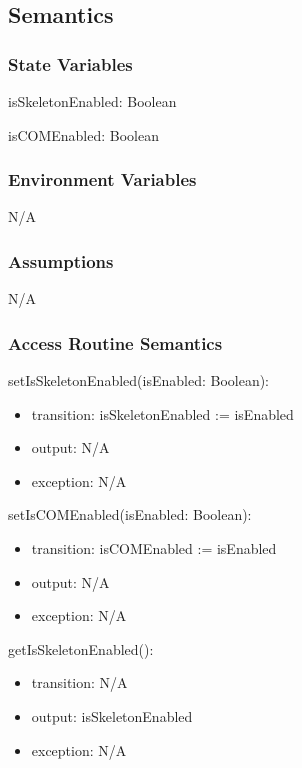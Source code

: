 \documentclass[12pt, titlepage]{article}
\begin{document}
\subsection{Semantics}

\subsubsection{State Variables}

\noindent isSkeletonEnabled: Boolean

\noindent isCOMEnabled: Boolean

\subsubsection{Environment Variables}

N/A

\subsubsection{Assumptions}

N/A

\subsubsection{Access Routine Semantics}

\noindent setIsSkeletonEnabled(isEnabled: Boolean):
\begin{itemize}
\item transition: isSkeletonEnabled := isEnabled
\item output: N/A
\item exception: N/A
\end{itemize}

\noindent setIsCOMEnabled(isEnabled: Boolean):
\begin{itemize}
\item transition: isCOMEnabled := isEnabled
\item output: N/A
\item exception: N/A
\end{itemize}

\noindent getIsSkeletonEnabled():
\begin{itemize}
\item transition: N/A
\item output: isSkeletonEnabled
\item exception: N/A
\end{itemize}
\end{document}
